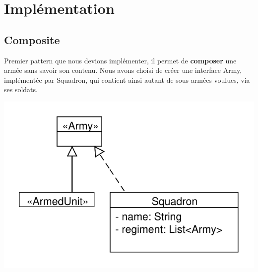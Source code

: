\documentclass[12pt]{article}
\begin{document}
\newpage
\section{Implémentation}
\subsection{Composite}
Premier pattern que nous devions implémenter, il permet de \textbf{composer} une armée sans savoir son contenu.
Nous avons choisi de créer une interface Army, implémentée par Squadron, qui contient ainsi autant de sous-armées voulues, via ses soldats.

\includegraphics[scale=1]{../UML/Composite}
\end{document}

